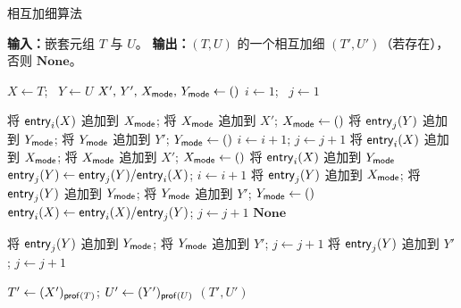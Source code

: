 \begin{BreakableAlgorithm}{相互加细算法}\label{mutualrefinementalgorithm}
\begin{algorithmic}[1]
\State \textbf{输入：}嵌套元组 $T$ 与 $U$。
\State \textbf{输出：}$(T,U)$ 的一个相互加细 $(T',U')$（若存在），否则 $\mathbf{None}$。
\algsep

\State $X \gets T$; \ $Y \gets U$
\State $X',\, Y',\, X_{\mathsf{mode}},\, Y_{\mathsf{mode}} \gets ()$
\State $i \gets 1$; \ $j \gets 1$

    \State 将 $\mathsf{entry}_i(X)$ 追加到 $X_{\mathsf{mode}}$;
    将 $X_{\mathsf{mode}}$ 追加到 $X'$;
    $X_{\mathsf{mode}}\gets()$
    \State 将 $\mathsf{entry}_j(Y)$ 追加到 $Y_{\mathsf{mode}}$;
    \State 将 $Y_{\mathsf{mode}}$ 追加到 $Y'$;
    \State $Y_{\mathsf{mode}}\gets()$
    \State $i \gets i+1$;
    \State $j \gets j+1$
    \State 将 $\mathsf{entry}_i(X)$ 追加到 $X_{\mathsf{mode}}$;
    \State 将 $X_{\mathsf{mode}}$ 追加到 $X'$;
    \State $X_{\mathsf{mode}}\gets()$
    \State 将 $\mathsf{entry}_i(X)$ 追加到 $Y_{\mathsf{mode}}$
    \State $\mathsf{entry}_j(Y) \gets \mathsf{entry}_j(Y)/\mathsf{entry}_i(X)$;
    \State $i \gets i+1$
    \State 将 $\mathsf{entry}_j(Y)$ 追加到 $X_{\mathsf{mode}}$;
    \State 将 $\mathsf{entry}_j(Y)$ 追加到 $Y_{\mathsf{mode}}$;
    \State 将 $Y_{\mathsf{mode}}$ 追加到 $Y'$;
    \State $Y_{\mathsf{mode}}\gets()$
    \State $\mathsf{entry}_i(X) \gets \mathsf{entry}_i(X)/\mathsf{entry}_j(Y)$;
    \State $j \gets j+1$
  \Else
    \State \Return $\mathbf{None}$
  \EndIf
\EndWhile

  \State 将 $\mathsf{entry}_j(Y)$ 追加到 $Y_{\mathsf{mode}}$;
  \State 将 $Y_{\mathsf{mode}}$ 追加到 $Y'$;
  \State $j \gets j+1$
\EndIf
{}
  \State 将 $\mathsf{entry}_j(Y)$ 追加到 $Y'$;
  \State $j \gets j+1$
\EndWhile

\State $T' \gets (X')_{\mathsf{prof}(T)}$;
\State $U' \gets (Y')_{\mathsf{prof}(U)}$
\State \Return $(T',U')$
\end{algorithmic}
\end{BreakableAlgorithm}


